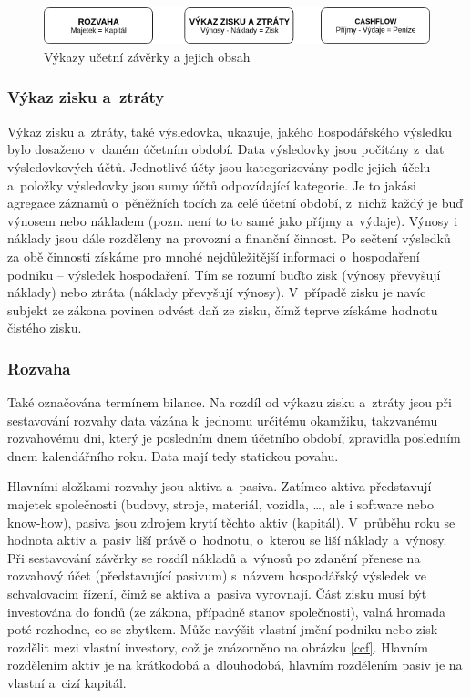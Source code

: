\begin{figure}
  \centering
  \includegraphics[width=14cm]{img/vykazy.png}
  \caption{Výkazy učetní závěrky a jejich obsah \cite{komplex}}
\end{figure}

\subsubsection{Výkaz zisku a~ztráty}
Výkaz zisku a~ztráty, také výsledovka, ukazuje, jakého hospodářského výsledku bylo dosaženo v~daném účetním období. Data výsledovky jsou počítány z~dat výsledovkových účtů. Jednotlivé účty jsou kategorizovány podle jejich účelu a~položky výsledovky jsou sumy účtů odpovídající kategorie. Je to jakási agregace záznamů o~pěněžních tocích za celé účetní období, z~nichž každý je buď výnosem nebo nákladem (pozn. není to to samé jako příjmy a~výdaje). Výnosy i náklady jsou dále rozděleny na provozní a finanční činnost. Po sečtení výsledků za obě činnosti získáme pro mnohé nejdůležitější informaci o~hospodaření podniku -- výsledek hospodaření. Tím se rozumí buďto zisk (výnosy převyšují náklady) nebo ztráta (náklady převyšují výnosy). V~případě zisku je navíc subjekt ze zákona povinen odvést daň ze zisku, čímž teprve získáme hodnotu čistého zisku.

\subsubsection{Rozvaha}
Také označována termínem bilance. Na rozdíl od výkazu zisku a~ztráty jsou při sestavování rozvahy data vázána k~jednomu určitému okamžiku, takzvanému rozvahovému dni, který je posledním dnem účetního období, zpravidla posledním dnem kalendářního roku. Data mají tedy statickou povahu.

Hlavními složkami rozvahy jsou aktiva a~pasiva. Zatímco aktiva představují majetek společnosti (budovy, stroje, materiál, vozidla, \dots, ale i software nebo know-how), pasiva jsou zdrojem krytí těchto aktiv (kapitál). V~průběhu roku se hodnota aktiv a~pasiv liší právě o~hodnotu, o~kterou se liší náklady a~výnosy. Při sestavování závěrky se rozdíl nákladů a~výnosů po zdanění přenese na rozvahový účet (představující pasivum) s~názvem hospodářský výsledek ve schvalovacím řízení, čímž se aktiva a~pasiva vyrovnají. Část zisku musí být investována do fondů (ze zákona, případně stanov společnosti), valná hromada poté rozhodne, co se zbytkem. Může navýšit vlastní jmění podniku nebo zisk rozdělit mezi vlastní investory, což je znázorněno na obrázku \ref{ccf}. Hlavním rozdělením aktiv je na krátkodobá a~dlouhodobá, hlavním rozdělením pasiv je na vlastní a~cizí kapitál.




